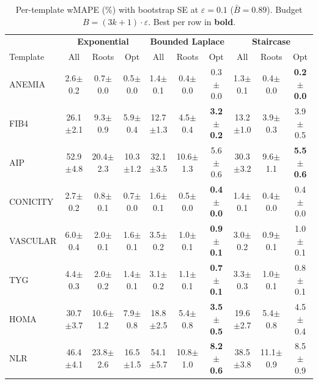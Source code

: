 \providecommand{\pmstd}[1]{{\scriptsize $\pm$#1}}

\begin{table}[t]
\centering
\setlength{\tabcolsep}{2.8pt}
\small
\caption{Per-template wMAPE (\%) with bootstrap SE at $\varepsilon = 0.1$ ($\bar{B} = 0.89$). Budget $B = (3k+1) \cdot \varepsilon$. Best per row in \textbf{bold}.}
\label{tab:rq1_3kplus1_per_tmpl_wmape}
\begin{tabular}{l|ccc|ccc|ccc}
\toprule
& \multicolumn{3}{c|}{\textbf{Exponential}} & \multicolumn{3}{c|}{\textbf{Bounded Laplace}} & \multicolumn{3}{c}{\textbf{Staircase}} \\
Template & All & Roots & Opt & All & Roots & Opt & All & Roots & Opt \\
\midrule
ANEMIA & 2.6\pmstd{0.2} & 0.7\pmstd{0.0} & 0.5\pmstd{0.0} & 1.4\pmstd{0.1} & 0.4\pmstd{0.0} & 0.3\pmstd{0.0} & 1.3\pmstd{0.1} & 0.4\pmstd{0.0} & \textbf{0.2\pmstd{0.0}} \\
FIB4 & 26.1\pmstd{2.1} & 9.3\pmstd{0.9} & 5.9\pmstd{0.4} & 12.7\pmstd{1.3} & 4.5\pmstd{0.4} & \textbf{3.2\pmstd{0.2}} & 13.2\pmstd{1.0} & 3.9\pmstd{0.3} & 3.9\pmstd{0.5} \\
AIP & 52.9\pmstd{4.8} & 20.4\pmstd{2.3} & 10.3\pmstd{1.2} & 32.1\pmstd{3.5} & 10.6\pmstd{1.3} & 5.6\pmstd{0.6} & 30.3\pmstd{3.2} & 9.6\pmstd{1.1} & \textbf{5.5\pmstd{0.6}} \\
CONICITY & 2.7\pmstd{0.2} & 0.8\pmstd{0.1} & 0.7\pmstd{0.0} & 1.6\pmstd{0.1} & 0.5\pmstd{0.0} & \textbf{0.4\pmstd{0.0}} & 1.4\pmstd{0.1} & 0.4\pmstd{0.0} & 0.4\pmstd{0.0} \\
VASCULAR & 6.0\pmstd{0.4} & 2.0\pmstd{0.1} & 1.6\pmstd{0.1} & 3.5\pmstd{0.2} & 1.0\pmstd{0.1} & \textbf{0.9\pmstd{0.1}} & 3.0\pmstd{0.2} & 0.9\pmstd{0.1} & 1.0\pmstd{0.1} \\
TYG & 4.4\pmstd{0.3} & 2.0\pmstd{0.2} & 1.4\pmstd{0.1} & 3.1\pmstd{0.2} & 1.1\pmstd{0.1} & \textbf{0.7\pmstd{0.1}} & 3.3\pmstd{0.3} & 1.0\pmstd{0.1} & 0.8\pmstd{0.1} \\
HOMA & 30.7\pmstd{3.7} & 10.6\pmstd{1.2} & 7.9\pmstd{0.8} & 18.8\pmstd{2.5} & 5.4\pmstd{0.8} & \textbf{3.5\pmstd{0.5}} & 19.6\pmstd{2.7} & 5.4\pmstd{0.8} & 4.5\pmstd{0.4} \\
NLR & 46.4\pmstd{4.1} & 23.8\pmstd{2.6} & 16.5\pmstd{1.5} & 54.1\pmstd{5.7} & 10.8\pmstd{1.0} & \textbf{8.2\pmstd{0.6}} & 38.5\pmstd{3.8} & 11.1\pmstd{0.9} & 8.5\pmstd{0.9} \\
\bottomrule
\end{tabular}
\end{table}
